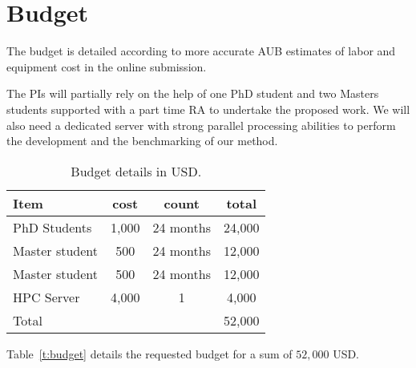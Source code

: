\section{Budget}

The budget is detailed according to more accurate 
AUB estimates of labor and equipment cost in the online
submission. 

The PIs will partially rely on the help of one PhD student and 
two Masters students supported with a part time RA
to undertake the proposed work.
%
We will also need a dedicated server with strong parallel 
processing abilities to perform the development and
the benchmarking of our method. 

\begin{table}
  \caption{Budget details in USD. } 
  \begin{tabular}{|l||c|c|c|} \hline 
    Item & cost & count & total \\ \hline \hline 
    PhD Students & 1,000 & 24 months & 24,000 \\ 
    Master student & 500 & 24 months & 12,000 \\ 
    Master student & 500 & 24 months & 12,000 \\ 
    HPC Server     & 4,000 & 1       & 4,000 \\ \hline
    Total          &       &         & 52,000 \\ \hline
  \end{tabular}
\end{table}

Table~\ref{t:budget} details the requested budget for a sum 
of $52,000$ USD. 

